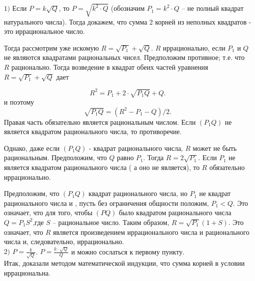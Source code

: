 \documentclass[a4paper,14pt]{article} %
\begin{document}
$1)$ Если $P = k\sqrt{Q}$, то $P = \sqrt{k^2\cdot Q}$ (обозначим $P_1 = k^2\cdot Q$ -- не полный квадрат натурального числа). Тогда докажем, что сумма 2 корней из неполных квадратов - это иррациональное число.

Тогда рассмотрим уже искомую $R = \sqrt{P_1} + \sqrt{Q}$. $R$ иррационально, если ${P_1}$ и $ Q$ не являются квадратами рациональных чисел. Предположим противное; т.е. что $R$ рационально. Тогда возведение в квадрат обеих частей уравнения $R = \sqrt{P_1} + \sqrt{Q}$ дает

\[ R^2 = P_1 + 2\cdot \sqrt{{P_1}Q} + Q.\] и поэтому \[\sqrt{{P_1}Q} = (R^2 - {P_1} - Q) \slash 2.\]
Правая часть обязательно является рациональным числом. Если $({P_1}Q)$ не является квадратом рационального числа, то противоречие.

Однако, даже если $({P_1}Q)$ - квадрат рационального числа, $R$ может не быть рациональным. Предположим, что $Q$ равно ${P_1}$. Тогда $R = 2\sqrt{{P_1}}$. Если ${P_1}$ не является квадратом рационального числа ( а оно не является), то $R$ обязательно иррационально.

Предположим, что $({P_1}Q)$ квадрат рационального числа, но ${P_1}$ не квадрат рационального числа и , пусть без ограничения общности положим, ${P_1} < Q$. Это означает, что для того, чтобы $(PQ)$ было квадратом рационального числа $Q = {P_1}S^2$,где $S$ -- рациональное число. Таким образом, $ R = \sqrt{{P_1}} (1 + S)$. Это означает, что $R$ является произведением иррационального числа и рационального числа и, следовательно, иррационально.\\

$2)$ $P = \frac{k}{\sqrt{Q}}$. $P = \frac{k\cdot \sqrt{Q}}{Q}$ и можно сослаться к первому пункту. \\

Итак, доказали методом математической индукции, что сумма корней в условии иррациональна.
\end{document}
